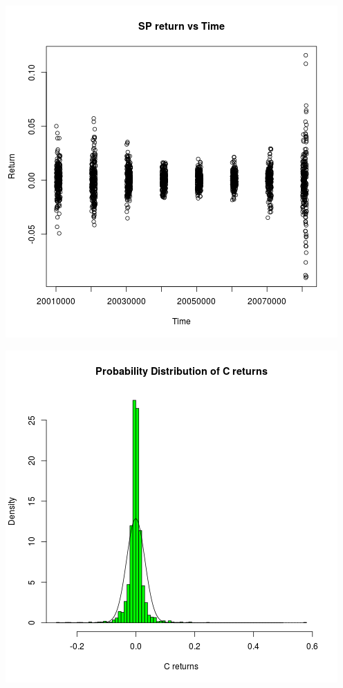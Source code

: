 \documentclass{article}
\begin{document}
\includegraphics{"plota2"}
\pagebreak

\includegraphics{"plota3"}
\pagebreak
\end{document}
